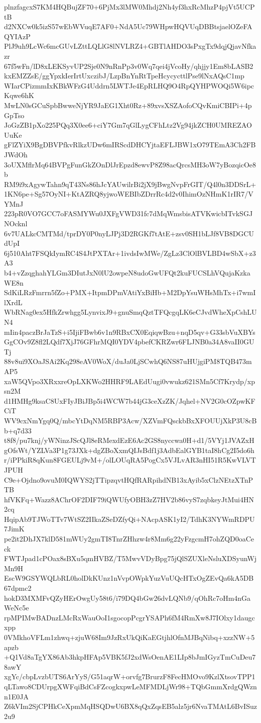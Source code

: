 plnzfagcxS7KM4HQBujZF70+6PjMx3lMW0Mhdj2Nh4yf3hxRcMhzP4pjVt5UCPtB
d2NXCw0k5izS57wEbWVuqE7AF0+NdA5Uc79WHpwHQVUqDBBtsjaelOZeFAQYIAzP
PlJ9uh9LcWc6mcGUvLZttLQLlG8lNVLRZ4+GBTlAHDO3sPxgTx9dqjQjavNfkazr
67f5wFn/lD8xLEKSyvUP2Sje0N9nRnPp3v0Wq7qei4jVcoHy/qhjjy1Em8bLASB2
kxEMZZsE/ggYpxkIerIrtUxczibJ/LzpBnYnRtTpeHcycycttlPse9lNxAQsC1mp
WIarCPizmmIxKBkWFzG4Uddrn5LWTJe4EpRLHQ9O4RpQYHPWOQi5W6ipcKqwe6hK
MwLN0sGCuSpbBwweNjYR9JaEG1Xht0Rz+89xvsXSZAofoCQvKmiCBIPi+4pGpTso
JoGzZB1pXo225PQq3X0ee6+ciY7Gm7qGlLygCFhLtz2Vg94jkZCH0UMREZAOUuKe
gFlZYiX9BgDBVPfkvRlkzUDw6mIRScdDHCYjtaEFLJBW1xO79TEmA3Ch2FBJWdOh
3oUXMflrMq64BVPgFunGkZOnDlJrEpzd8ewvP8Z98acQrcsMH3oW7yBozqicOe8b
RM9i9xAgywTahn9qT43Ns86hJcYAUwilrBi2jX9jBwgNvpFrGIT/Q4l0n3DDSrL+
1KN6pe+Sg57OyNI+KtAZRQ8yjwoWEBIbZDrrRc4d2v0IhimOzNHmK1rIR7/VYMnJ
223pR0VO7GCC7oFASMYWu0JXFgVWD31fc7dMqWmsbisATVKwicbITvkSGJNOcknl
6v7UALkcCMTMd/tprDY0P0nyLJPj3D2RGKf7tAtE+zsv0SH1bLJf8VB8DGCUdUpI
6j510Aht7FSQkIymRC4S4JtPXTAr+1ivdsIwMWe/ZgLz3ClOlBVLBD4wSbX+z3A3
b4+vZzqghahYLGm3DIutJxN0lU2owpeN8udoGwUFQt2kuFUCSLhVQujaKzkaWE8n
SdKiLRzFmrrn5fZo+PMX+ItpmDPmVAtiYxBiHb+M2DpYsuWHsMhTx+i7wmIlXrdL
WbRNag0ex5HfkZrwhgg5LynvixJ9+gnuSmqQztTFQcgqLK6eCJvdWheXpCshLUN4
mIin4paczBrJaTzS+i5IjiFBwb6v1n9RBxCX0EqiqwBzu+nqD5qv+G33sbVuXBYs
GgCOv9Z8fl2LQdf7XjJ76GFhrMQI0YDV4pbefCKRZwr6FLJNB0a34A8vaII0GUTj
88v8ui9XOaJSAi2Kq298eAV0WoX/duJa0LjSCwhQ6NS87uHUjgiPM8TQB473mAP5
xaW5QVpo3XRxxreOpLXKWo2HHRF9LAEdUugi0vwukz621SMn5Cf7Krydp/xpsn2M
d1HMHg9ksaC8UxFIyJBiJBp5i4WCW7b44jG3ceXzZK/Jqhel+NV2G0cOZpwKFCiT
WV9cxNmYgq0Q/mbcYtDqNM5RBP3Acw/XZVmFQsckbBxXFOUUjXkP3U8cBb+q7d33
t8f8/pu7knj/yWNinzJScQJl8eRMexdEzE6Ac2GS8nyccwa0H+d1/5VYj1JVAZxH
gOfsWt/YZLVa3P1g73JXk+dgZBoXxmQIJsBdf1j3AdbEalGYB1taI8hCg2I5do6h
r/iPPkiR8qKun8FGEULj9vM+/olLOUqRA5PogCx5VJLvAR3nHI51R5KwVLVTJPUH
C9e+Ojdno9ovuM0IQWYS2jTTipzqvtHQfRARpihdNB13xAyib5xClzNEtzXTnPTB
hfVKFq+Wazz8AChrOF2DIF79iQWUfyOBH3zZ7HV2b86vyS7zqbkeyJtMui4HN2cq
HqipAb9TJWoTTv7WtSZ2IIkaZSeDZfyQi+NAcpASK1yI2/TdhK3NYWmRDPU7JimK
pe2it2DhJX7klD581mWUy2gmTI8TnrZHhzw4r8Mm6g22yFzgcmH7ohZQD0oaCeck
FWTJpad1cPOax8sBXu5qmHVBZ/T5MwvVDyBpg75jQlSZUXleNsluXDSyunWjMn9H
EscW9GSYWQLbRL0holDkKUnz1nVvpOWpkYuzVuUQcHTxOgZEvQa6kA5DB67dpmc2
hokD3MXMFvQZyHErOwgUy58t6/i79DQ4bGw26dvLQNb9/qOhRc7oHm4nGaWeNc5e
rpMPIMwBADnzLMcRxWauOoI1sgocopPcgrYSAPh6fM4RmXw8J7IOlxy1daugcxpp
0VMkhoVFLm1zhwq+zjuW68Im9JzRxUkQiKaEGtjhlOfnMJBqNibq+xzzNW+5apzb
+Q1Vd8aTgYX86Ab3hkpHFAp5VBK5fJ2xdWsOenAE1LIp8bJmIGyzTmCuDeu78awY
xgYc/cbpLvzbUTS6ArYyS/G51aqrW+orvfg7BrurzF8FecHMOvo9KzlXtsovTPP1
qLTawo8CDUrpgXWFqiBdCsFZcogkxpwLeMFMDLjWr98+TQbGmmXrdgQWznn1E0JA
Z6kVIm2SjCPHkCeXpmMqHSQDwU6BX8qQxZqsEB5alz5jr6NvaTMAtL6BvISuz2u9
